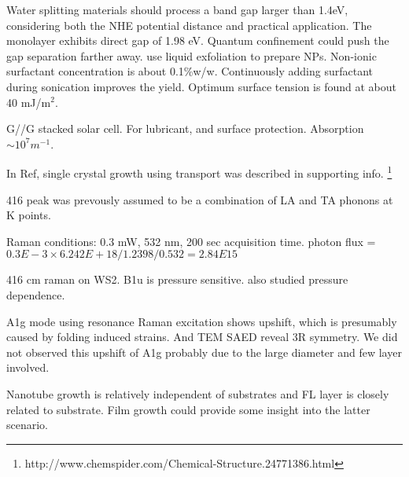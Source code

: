 Water splitting materials should process a band gap larger than 1.4eV, considering both the NHE potential distance and practical application. The monolayer  exhibits direct gap of 1.98 eV. Quantum confinement could push the gap separation farther away. \cite{wilcoxon1997} \citeauthor{Notley2013} use liquid exfoliation to prepare  NPs.\cite{Notley2013} Non-ionic surfactant concentration is about 0.1\%w/w. Continuously adding surfactant during sonication improves the yield. Optimum surface tension is found at about 40 mJ/m$^2$.

G//G stacked solar cell. For lubricant, and surface protection. Absorption $\sim 10^7 m^{-1}$. \cite{Britnell2013}

In Ref\cite{Zeng2013}, single crystal  growth using  transport was described in supporting info.
\footnote{http://www.chemspider.com/Chemical-Structure.24771386.html}



416 peak was prevously assumed to be a combination of LA and TA phonons at K points.

Raman conditions: 0.3 mW, 532 nm, 200 sec acquisition time. photon flux = $0.3E-3\times6.242E+18/1.2398/0.532=2.84E15$

416 cm raman on WS2. B1u is pressure sensitive. \cite{Staiger2012} also studied pressure dependence.

A1g mode using resonance Raman excitation shows upshift, which is presumably caused by folding induced strains. And TEM SAED reveal 3R symmetry. We did not observed this upshift of A1g probably due to the large diameter and few layer involved.

Nanotube growth is relatively independent of substrates and FL layer is closely related to substrate. Film growth could provide some insight into the latter scenario.

